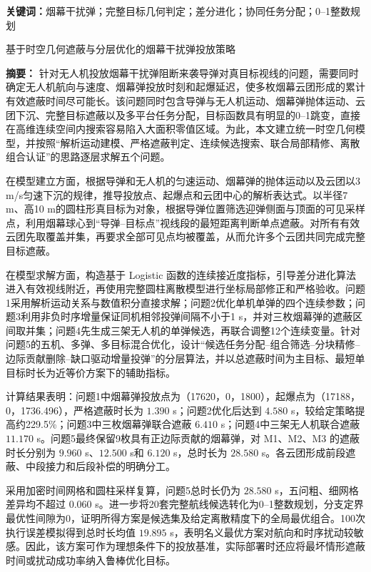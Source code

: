 \documentclass[12pt,a4paper]{ctexart}
\begin{document}
\vspace{0.5em}
\noindent\textbf{关键词：}烟幕干扰弹；完整目标几何判定；差分进化；协同任务分配；0--1整数规划

\iffalse

\begin{center}
{\heiti{}基于时空几何遮蔽与分层优化的烟幕干扰弹投放策略}
\end{center}

\vspace{0.6em}
\noindent\textbf{摘\quad 要：}
针对无人机投放烟幕干扰弹阻断来袭导弹对真目标视线的问题，需要同时确定无人机航向与速度、烟幕弹投放时刻和起爆延迟，使多枚烟幕云团形成的累计有效遮蔽时间尽可能长。该问题同时包含导弹与无人机运动、烟幕弹抛体运动、云团下沉、完整目标遮蔽以及多平台任务分配，目标函数具有明显的0--1跳变，直接在高维连续空间内搜索容易陷入大面积零值区域。为此，本文建立统一时空几何模型，并按照“解析运动建模、严格遮蔽判定、连续候选搜索、联合局部精修、离散组合认证”的思路逐层求解五个问题。

在模型建立方面，根据导弹和无人机的匀速运动、烟幕弹的抛体运动以及云团以3 m/s匀速下沉的规律，推导投放点、起爆点和云团中心的解析表达式。以半径7 m、高10 m的圆柱形真目标为对象，根据导弹位置筛选迎弹侧面与顶面的可见采样点，利用烟幕球心到“导弹--目标点”视线段的最短距离判断单点遮蔽。对所有有效云团先取覆盖并集，再要求全部可见点均被覆盖，从而允许多个云团共同完成完整目标遮蔽。

在模型求解方面，构造基于 Logistic 函数的连续接近度指标，引导差分进化算法进入有效视线附近，再使用完整圆柱离散模型进行坐标局部修正和严格验收。问题1采用解析运动关系与数值积分直接求解；问题2优化单机单弹的四个连续参数；问题3利用非负时序增量保证同机相邻投弹间隔不小于1 s，并对三枚烟幕弹的遮蔽区间取并集；问题4先生成三架无人机的单弹候选，再联合调整12个连续变量。针对问题5的五机、多弹、多目标混合优化，设计“候选任务分配--组合筛选--分块精修--边际贡献删除--缺口驱动增量投弹”的分层算法，并以总遮蔽时间为主目标、最短单目标时长为近等价方案下的辅助指标。

计算结果表明：问题1中烟幕弹投放点为（17620，0，1800），起爆点为（17188，0，1736.496），严格遮蔽时长为 $1.390$ s；问题2优化后达到 $4.580$ s，较给定策略提高约229.5\%；问题3中三枚烟幕弹联合遮蔽 $6.410$ s；问题4中三架无人机联合遮蔽 $11.170$ s。问题5最终保留9枚具有正边际贡献的烟幕弹，对 M1、M2、M3 的遮蔽时长分别为 $9.960$ s、$12.500$ s和 $6.120$ s，总时长为 $28.580$ s。各云团形成前段遮蔽、中段接力和后段补偿的明确分工。

采用加密时间网格和圆柱采样复算，问题5总时长仍为 $28.580$ s，五问粗、细网格差异均不超过 $0.060$ s。进一步将20套完整航线候选转化为0--1整数规划，分支定界最优性间隙为0，证明所得方案是候选集及给定离散精度下的全局最优组合。100次执行误差模拟得到总时长均值 $19.895$ s，表明名义最优方案对航向和时序扰动较敏感。因此，该方案可作为理想条件下的投放基准，实际部署时还应将最坏情形遮蔽时间或扰动成功率纳入鲁棒优化目标。
\end{document}
